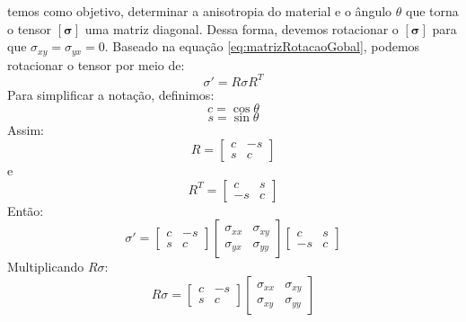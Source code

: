 \documentclass[
12pt,
a4paper,
oneside,
chapter=TITLE,
sumario=tradicional
]{abntex2}
\begin{document}
temos como objetivo, determinar a anisotropia do material e o ângulo $\theta$ que torna o tensor $[\mathbf{\sigma}]$ uma matriz diagonal. Dessa forma, devemos rotacionar o $[\mathbf{\sigma}]$ para que  $\sigma_{xy} = \sigma_{yx} = 0$. Baseado na equação \ref{eq:matrizRotacaoGobal}, podemos rotacionar o tensor por meio de:
\begin{equation*} %
	\sigma' = R \sigma R^T 
\end{equation*}
Para simplificar a notação, definimos:
\begin{equation*}
c=\cos\theta  
\end{equation*}
\begin{equation*}
s=\sin\theta  
\end{equation*}
Assim:
\begin{equation*}
R =  
\begin{bmatrix}  
	c & -s \\  
	s & c  
\end{bmatrix}  
\end{equation*}
e
\begin{equation*}
R^T =  
\begin{bmatrix}  
	c & s \\  
	-s & c  
\end{bmatrix}  
\end{equation*}
Então:
\begin{equation*}
	\sigma' = 
	\begin{bmatrix}  
		c & -s \\  
		s & c  
	\end{bmatrix} 
	\begin{bmatrix}  
		\sigma_{xx} & \sigma_{xy} \\  
		\sigma_{yx} &\sigma_{yy} 
	\end{bmatrix}	
	\begin{bmatrix}  
		c & s \\  
		-s & c  
	\end{bmatrix} 
\end{equation*}
Multiplicando $R\sigma$:
\begin{equation*}
R\sigma=
\begin{bmatrix}  
	c & -s \\  
	s & c  
\end{bmatrix}  
\begin{bmatrix}  
	\sigma_{xx} & \sigma_{xy} \\  
	\sigma_{xy} & \sigma_{yy}  
\end{bmatrix}  
\end{equation*}
\end{document}
